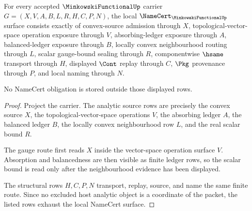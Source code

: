 \begin{theorem}
\label{thm:minkowski-functional-namecert-obligations}
For every accepted $\MinkowskiFunctionalUp$ carrier $G=(X,V,A,B,L,R,H,C,P,N)$, the local $\NameCert_{\MinkowskiFunctionalUp}$ surface consists exactly of convex-source admission through $X$, topological-vector-space operation exposure through $V$, absorbing-ledger exposure through $A$, balanced-ledger exposure through $B$, locally convex neighbourhood routing through $L$, scalar gauge-bound sealing through $R$, componentwise $\hsame$ transport through $H$, displayed $\Cont$ replay through $C$, $\Pkg$ provenance through $P$, and local naming through $N$.

No NameCert obligation is stored outside those displayed rows.
\end{theorem}
\begin{proof}
Project the carrier. The analytic source rows are precisely the convex source $X$, the topological-vector-space operations $V$, the absorbing ledger $A$, the balanced ledger $B$, the locally convex neighbourhood row $L$, and the real scalar bound $R$.

The gauge route first reads $X$ inside the vector-space operation surface $V$. Absorption and balancedness are then visible as finite ledger rows, so the scalar bound is read only after the neighbourhood evidence has been displayed.

The structural rows $H,C,P,N$ transport, replay, source, and name the same finite route. Since no excluded host analytic object is a coordinate of the packet, the listed rows exhaust the local NameCert surface.
\end{proof}

